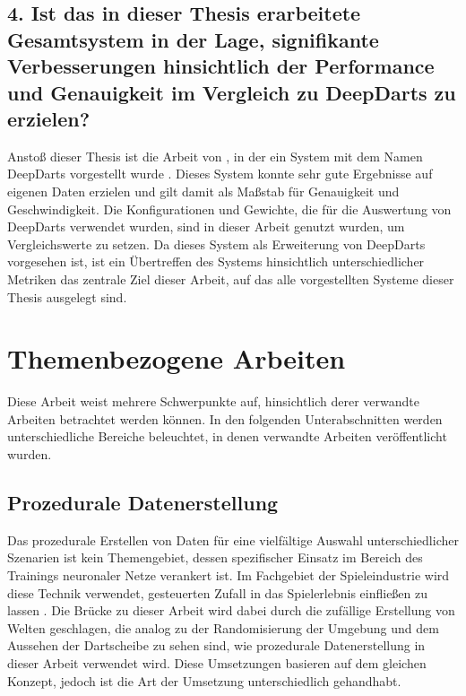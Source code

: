 \subsection*{4. Ist das in dieser Thesis erarbeitete Gesamtsystem in der Lage, signifikante Verbesserungen hinsichtlich der Performance und Genauigkeit im Vergleich zu DeepDarts zu erzielen?}

Anstoß dieser Thesis ist die Arbeit von \citeauthor{deepdarts}, in der ein System mit dem Namen DeepDarts vorgestellt wurde \cite{deepdarts}. Dieses System konnte sehr gute Ergebnisse auf eigenen Daten erzielen und gilt damit als Maßstab für Genauigkeit und Geschwindigkeit. Die Konfigurationen und Gewichte, die für die Auswertung von DeepDarts verwendet wurden, sind in dieser Arbeit genutzt wurden, um Vergleichswerte zu setzen. Da dieses System als Erweiterung von DeepDarts vorgesehen ist, ist ein Übertreffen des Systems hinsichtlich unterschiedlicher Metriken das zentrale Ziel dieser Arbeit, auf das alle vorgestellten Systeme dieser Thesis ausgelegt sind.


\section{Themenbezogene Arbeiten}
\label{sec:related_work}

Diese Arbeit weist mehrere Schwerpunkte auf, hinsichtlich derer verwandte Arbeiten betrachtet werden können. In den folgenden Unterabschnitten werden unterschiedliche Bereiche beleuchtet, in denen verwandte Arbeiten veröffentlicht wurden.

\subsection{Prozedurale Datenerstellung}

Das prozedurale Erstellen von Daten für eine vielfältige Auswahl unterschiedlicher Szenarien ist kein Themengebiet, dessen spezifischer Einsatz im Bereich des Trainings neuronaler Netze verankert ist. Im Fachgebiet der Spieleindustrie wird diese Technik verwendet, gesteuerten Zufall in das Spielerlebnis einfließen zu lassen \cite{proc_data_games_1,proc_data_games_2,proc_data_games_3}. Die Brücke zu dieser Arbeit wird dabei durch die zufällige Erstellung von Welten geschlagen, die analog zu der Randomisierung der Umgebung und dem Aussehen der Dartscheibe zu sehen sind, wie prozedurale Datenerstellung in dieser Arbeit verwendet wird. Diese Umsetzungen basieren auf dem gleichen Konzept, jedoch ist die Art der Umsetzung unterschiedlich gehandhabt.

